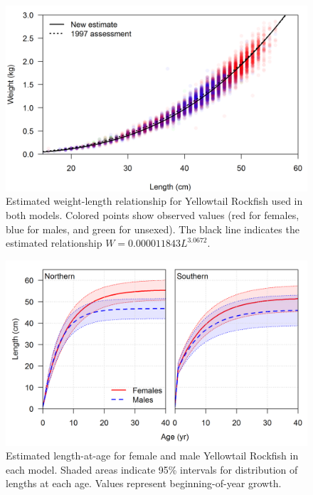 \documentclass[12pt,]{article}
\begin{document}
\begin{figure}[htbp]
\centering
\includegraphics{Figures/weight-length_fit.png}
\caption{Estimated weight-length relationship for Yellowtail Rockfish
used in both models. Colored points show observed values (red for
females, blue for males, and green for unsexed). The black line
indicates the estimated relationship
\(W = 0.000011843L^{3.0672}\).\label{fig:weight-length}}
\end{figure}

\FloatBarrier

\FloatBarrier

\begin{figure}[htbp]
\centering
\includegraphics{r4ss/plots_compare/growth_comparison.png}
\caption{Estimated length-at-age for female and male Yellowtail Rockfish
in each model. Shaded areas indicate 95\% intervals for distribution of
lengths at each age. Values represent beginning-of-year growth.
\label{fig:growth}}
\end{figure}
\end{document}
